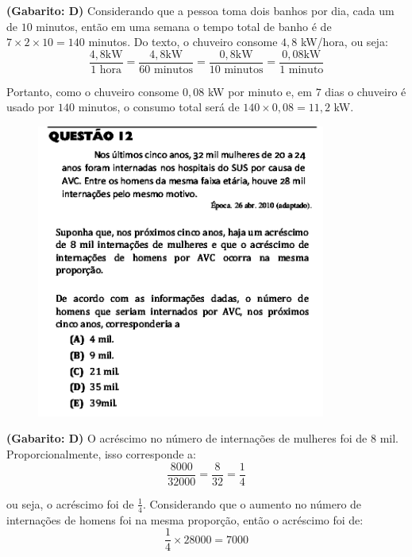 \documentclass[a4paper]{article}
\begin{document}
\par\textbf{(Gabarito: D)} Considerando que a pessoa toma dois banhos por dia, cada um de $10$ minutos, então em uma semana o tempo total de banho é de $7\times 2\times 10 = 140$ minutos. 
Do texto, o chuveiro consome $4,8$ kW/hora, ou seja:
\begin{equation*}
\frac{4,8\text{kW}}{1\text{ hora}} = \frac{ 4,8\text{kW} }{ 60\text{ minutos} } = \frac{ 0,8\text{kW} }{ 10\text{ minutos} } = \frac{0,08\text{kW}}{1 \text{ minuto}}
\end{equation*}
\par\vspace{0.3cm} Portanto, como o chuveiro consome $0,08$ kW por minuto e, em $7$ dias o chuveiro é usado por $140$ minutos, o consumo total será de $140\times 0,08 = 11,2$ kW.
\begin{figure}[H]
	\begin{center}
		\includegraphics[width=9.5cm]{L2Q12.png}
	\end{center}
\end{figure}
\par\textbf{(Gabarito: D)} O acréscimo no número de internações de mulheres foi de $8$ mil. Proporcionalmente, isso corresponde a:
\begin{equation*}
\frac{8000}{32000} = \frac{8}{32} = \frac{1}{4} 
\end{equation*}
\par\vspace{0.3cm} ou seja, o acréscimo foi de $\displaystyle{\frac{1}{4}}$. Considerando que o aumento no número de internações de homens foi na mesma proporção, então o acréscimo foi de:
\begin{equation*}
\frac{1}{4}\times 28000 = 7000
\end{equation*}
\end{document}
